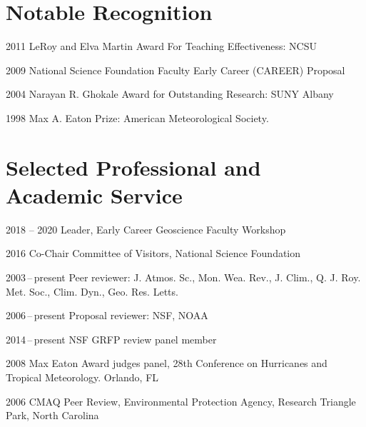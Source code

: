 
\section*{Notable Recognition}

\begin{tlist}

\item[2011] LeRoy and Elva Martin Award For Teaching Effectiveness: NCSU
\item[2009] National Science Foundation Faculty Early Career (CAREER) Proposal
\item[2004] Narayan R. Ghokale Award for Outstanding Research: SUNY Albany
\item[1998] Max A. Eaton Prize: American Meteorological Society.

\end{tlist}



\section*{Selected Professional and Academic Service}

\begin{tlist}
\item[2018 -- 2020] Leader, Early Career Geoscience Faculty Workshop 
\item[2016] Co-Chair Committee of Visitors, National Science Foundation
\item[2003\,--\,present] Peer reviewer: J. Atmos. Sc., Mon. Wea. Rev., J. Clim., Q. J. Roy. Met. Soc., Clim. Dyn., Geo. Res. Letts.
\item[2006\,--\,present] Proposal reviewer: NSF, NOAA
\item[2014\,--\,present] NSF GRFP review panel member
\item[2008] Max Eaton Award judges panel, 28th Conference on Hurricanes and Tropical Meteorology. Orlando, FL
\item[2006] CMAQ Peer Review, Environmental Protection Agency, Research Triangle Park, North Carolina
\end{tlist}


